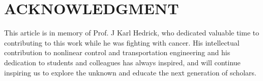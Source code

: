 \documentclass[journal]{IEEEtranTIE}
\theoremstyle{remark}
\begin{document}
	
	
	
	
	
	
	
	\section*{ACKNOWLEDGMENT}
	This article is in memory of Prof. J Karl Hedrick, who dedicated valuable time to contributing to this work while he was fighting with cancer. 
	His intellectual contribution to nonlinear control and transportation engineering and his dedication to students and colleagues has always inspired, and will continue inspiring us to explore the unknown and educate the next generation of scholars.
	
	
	
	
\end{document}
